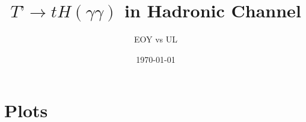 \documentclass[usenames,dvipsnames]{beamer} %
\title{$T’ \to tH(\gamma\gamma)$ in Hadronic Channel}
\author{EOY vs UL}
\date{\today}
\begin{document}
\frame{\titlepage}

%

\section{Plots}

\end{document}

